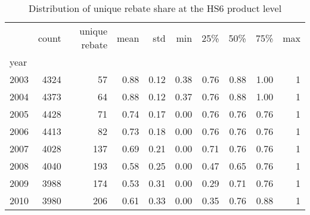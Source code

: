 \documentclass[preview]{standalone}
\begin{document}
\begin{table}[!htbp] \centering
\caption{Distribution of unique rebate share at the HS6 product level}

\begin{adjustbox}{width=\textwidth, totalheight=\baselineskip,keepaspectratio}
\begin{tabular}{lrrrrrrrrr}
\toprule
{} &  count &  unique rebate &  mean &   std &   min &   25\% &   50\% &   75\% &  max \\
year &        &                &       &       &       &       &       &       &      \\
\midrule
2003 &   4324 &             57 &  0.88 &  0.12 &  0.38 &  0.76 &  0.88 &  1.00 &    1 \\
2004 &   4373 &             64 &  0.88 &  0.12 &  0.37 &  0.76 &  0.88 &  1.00 &    1 \\
2005 &   4428 &             71 &  0.74 &  0.17 &  0.00 &  0.76 &  0.76 &  0.76 &    1 \\
2006 &   4413 &             82 &  0.73 &  0.18 &  0.00 &  0.76 &  0.76 &  0.76 &    1 \\
2007 &   4028 &            137 &  0.69 &  0.21 &  0.00 &  0.71 &  0.76 &  0.76 &    1 \\
2008 &   4040 &            193 &  0.58 &  0.25 &  0.00 &  0.47 &  0.65 &  0.76 &    1 \\
2009 &   3988 &            174 &  0.53 &  0.31 &  0.00 &  0.29 &  0.71 &  0.76 &    1 \\
2010 &   3980 &            206 &  0.61 &  0.33 &  0.00 &  0.35 &  0.76 &  0.88 &    1 \\
\bottomrule
\end{tabular}

\end{adjustbox}

\begin{tablenotes}
\small
\item


\end{tablenotes}
\end{table}
\end{document}
